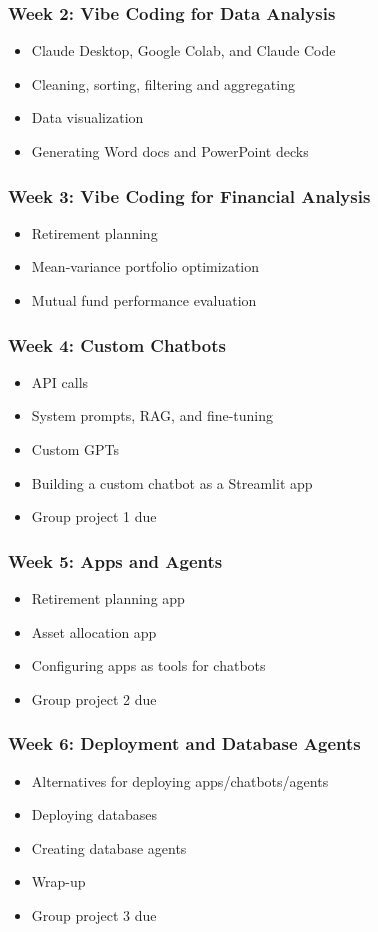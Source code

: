 \documentclass[11pt]{article}
\begin{document}
\subsubsection*{Week 2: Vibe Coding for Data Analysis}
\begin{itemize}\setlength{\itemsep}{0pt}
\item Claude Desktop, Google Colab, and Claude Code
\item Cleaning, sorting, filtering and aggregating
\item Data visualization
\item Generating Word docs and PowerPoint decks 
\end{itemize}

\subsubsection*{Week 3: Vibe Coding for Financial Analysis}
\begin{itemize}\setlength{\itemsep}{0pt}
\item Retirement planning 
\item Mean-variance portfolio optimization
\item Mutual fund performance evaluation 
\end{itemize}

\subsubsection*{Week 4: Custom Chatbots}
\begin{itemize}\setlength{\itemsep}{0pt}
\item API calls
\item System prompts, RAG, and fine-tuning
\item Custom GPTs
\item Building a custom chatbot as a Streamlit app
\item Group project 1 due
\end{itemize}

\subsubsection*{Week 5: Apps and Agents}
\begin{itemize}\setlength{\itemsep}{0pt}
\item Retirement planning app
\item Asset allocation app 
\item Configuring apps as tools for chatbots
\item Group project 2 due
\end{itemize}

\subsubsection*{Week 6: Deployment and Database Agents}
\begin{itemize}\setlength{\itemsep}{0pt}
\item Alternatives for deploying apps/chatbots/agents
\item Deploying databases
\item Creating database agents
\item Wrap-up
\item Group project 3 due
\end{itemize}
\end{document}
